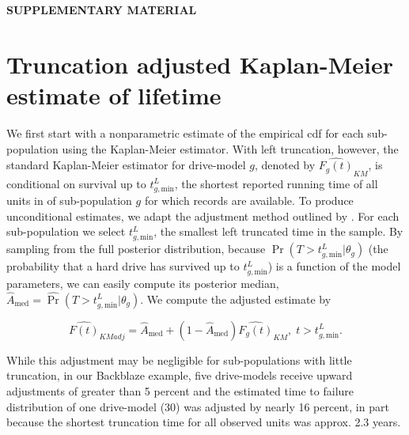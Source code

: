 \documentclass[12pt]{article}
\begin{document}
\def\spacingset#1{\renewcommand{\baselinestretch}%
{#1}\small\normalsize} \spacingset{1}

\begin{center}
{\large\bf SUPPLEMENTARY MATERIAL}
\end{center}

{\appendix
\section{Truncation adjusted Kaplan-Meier estimate of lifetime}
\label{sec:trunc-adj}
We first start with a nonparametric estimate of the empirical cdf for each sub-population using the Kaplan-Meier estimator.  With left truncation, however, the standard Kaplan-Meier estimator for drive-model $g$, denoted by
$\widehat{F_g(t)}_{KM}$, is conditional on survival up to
$t_{g,\text{min}}^L$, the shortest reported running time of all units in
of sub-population $g$ for which records are available. To produce
unconditional estimates, we adapt the adjustment method outlined by \citet[Chapter 11]{meeker}.  For each sub-population we select
$t_{g,\text{min}}^L$, the smallest left truncated time in the sample.
By sampling from the full posterior distribution, because
$\Pr(T>t_{g,\text{min}}^L|\theta_g)$ (the probability that a hard drive has
survived up to $t_{g,\text{min}}^L$) is a function of the model
parameters, we can easily compute its posterior median,
$\widehat{A}_{\text{med}} = \widehat{\Pr}(T>t_{g,\text{min}}^L|\theta_g)$. We compute the adjusted estimate by

$$\widehat{F(t)}_{KMadj} = \widehat{A}_{\text{med}} + \left(1 - \widehat{A}_{\text{med}}\right)\widehat{F_g(t)}_{KM},\; t>t_{g,\text{min}}^L.$$

While this adjustment may be negligible for sub-populations with little truncation, in our Backblaze example, five drive-models receive upward adjustments of greater than 5 percent and the estimated time to failure distribution of one drive-model (30) was adjusted by nearly 16 percent, in part because the shortest truncation time for all observed units was approx. 2.3 years.

}
\end{document}

